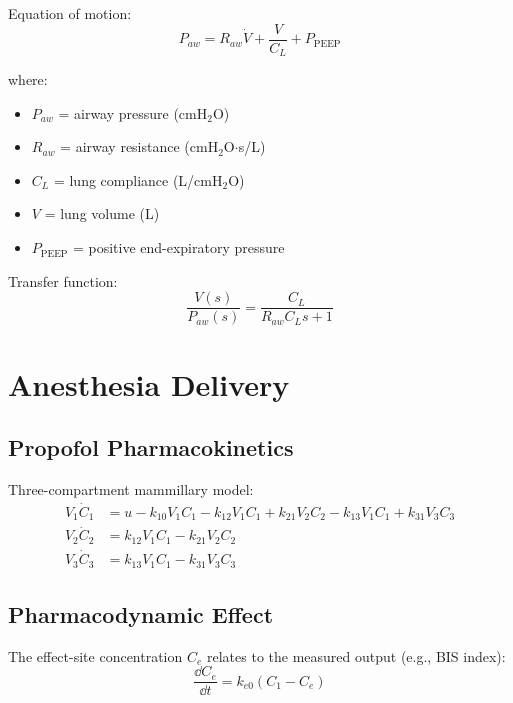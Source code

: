

Equation of motion:
\begin{equation}
P_{aw} = R_{aw}\dot{V} + \frac{V}{C_L} + P_{\text{PEEP}}
\end{equation}

where:
\begin{itemize}
    \item $P_{aw}$ = airway pressure (cmH$_2$O)
    \item $R_{aw}$ = airway resistance (cmH$_2$O$\cdot$s/L)
    \item $C_L$ = lung compliance (L/cmH$_2$O)
    \item $V$ = lung volume (L)
    \item $P_{\text{PEEP}}$ = positive end-expiratory pressure
\end{itemize}

Transfer function:
\begin{equation}
\frac{V(s)}{P_{aw}(s)} = \frac{C_L}{R_{aw}C_L s + 1}
\end{equation}

\section{Anesthesia Delivery}
\label{sec:anesthesia}

\subsection{Propofol Pharmacokinetics}

Three-compartment mammillary model:
\begin{align}
V_1\dot{C}_1 &= u - k_{10}V_1 C_1 - k_{12}V_1 C_1 + k_{21}V_2 C_2 - k_{13}V_1 C_1 + k_{31}V_3 C_3 \\
V_2\dot{C}_2 &= k_{12}V_1 C_1 - k_{21}V_2 C_2 \\
V_3\dot{C}_3 &= k_{13}V_1 C_1 - k_{31}V_3 C_3
\end{align}

\subsection{Pharmacodynamic Effect}

The effect-site concentration $C_e$ relates to the measured output (e.g., BIS index):
\begin{equation}
\frac{\dd C_e}{\dd t} = k_{e0}(C_1 - C_e)
\end{equation}

